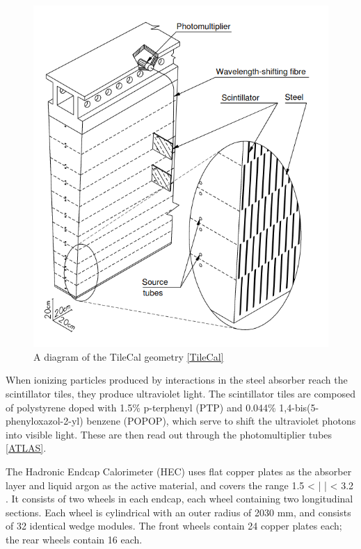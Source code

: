 \begin{figure}
  \includegraphics[width=\linewidth]{figures/detector_chapter/TileCal.png}
  \caption{A diagram of the TileCal geometry \ref{TileCal}}
  \label{fig:TileCalDiagram}
\end{figure}

When ionizing particles produced by interactions in the steel absorber reach the scintillator tiles, they produce ultraviolet light. The scintillator tiles are composed of polystyrene doped with 1.5\%  p-terphenyl (PTP) and 0.044\% 1,4-bis(5-phenyloxazol-2-yl) benzene (POPOP), which serve to shift the ultraviolet photons into visible light. These are then read out through the photomultiplier tubes \ref{ATLAS}.

The Hadronic Endcap Calorimeter (HEC) uses flat copper plates as the absorber layer and liquid argon as the active material, and covers the range  1.5 < | \eta | < 3.2 . It consists of two wheels in each endcap, each wheel containing two longitudinal sections. Each wheel is cylindrical with an outer radius of 2030 mm, and consists of 32 identical wedge modules. The front wheels contain 24 copper plates each; the rear wheels contain 16 each.


